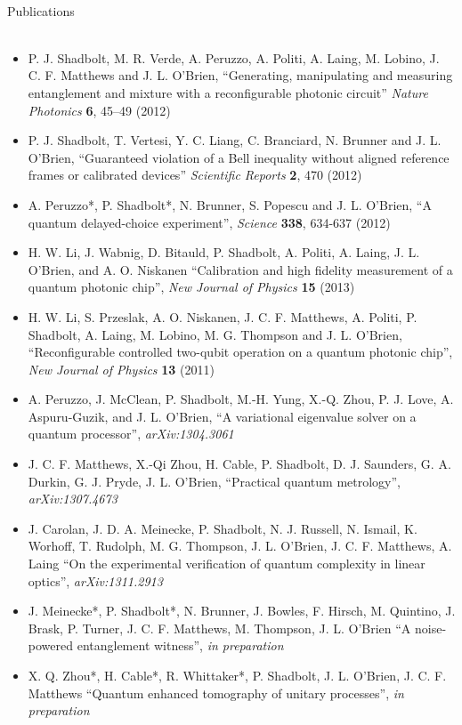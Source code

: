 \newpage
~\\
\vspace{00pt}
{\Large \sc Publications \\ \rm}
\vspace{15pt}
\

{\renewcommand\labelitemi{}
\begin{itemize}[leftmargin=0pt]
\item P. J. Shadbolt, M. R. Verde, A. Peruzzo, A. Politi, A. Laing, M. Lobino, J. C. F. Matthews and J. L. O'Brien, ``Generating, manipulating and measuring entanglement and mixture with a reconfigurable photonic circuit'' \textit{Nature Photonics} \textbf{6}, 45--49 (2012)
\item P. J. Shadbolt, T. Vertesi, Y. C. Liang, C. Branciard, N. Brunner and J. L. O'Brien, ``Guaranteed violation of a Bell inequality without aligned reference frames or calibrated devices'' \textit{Scientific Reports} \textbf{2}, 470 (2012)
\item A. Peruzzo*, P. Shadbolt*, N. Brunner, S. Popescu and J. L. O'Brien, ``A quantum delayed-choice experiment'',  \textit{Science} \textbf{338}, 634-637 (2012)
\item H. W. Li, J. Wabnig, D. Bitauld, P. Shadbolt, A. Politi, A. Laing, J. L. O'Brien, and A. O. Niskanen ``Calibration and high fidelity measurement of a quantum photonic chip'', \textit{New Journal of Physics} \textbf{15} (2013) 
\item H. W. Li, S. Przeslak, A. O. Niskanen, J. C. F. Matthews, A. Politi, P. Shadbolt, A. Laing, M. Lobino, M. G. Thompson and J. L. O'Brien, ``Reconfigurable controlled two-qubit operation on a quantum photonic chip'', \textit{New Journal of Physics} \textbf{13} (2011) 
\item A. Peruzzo, J. McClean, P. Shadbolt, M.-H. Yung, X.-Q. Zhou, P. J. Love, A. Aspuru-Guzik, and J. L. O'Brien, ``A variational eigenvalue solver on a quantum processor'', \emph{arXiv:1304.3061}
\item J. C. F. Matthews, X.-Qi Zhou, H. Cable, P. Shadbolt, D. J. Saunders, G. A. Durkin, G. J. Pryde, J. L. O'Brien, ``Practical quantum metrology'', \emph{arXiv:1307.4673}
\item J. Carolan, J. D. A. Meinecke, P. Shadbolt, N. J. Russell, N. Ismail, K. Worhoff, T. Rudolph, M. G. Thompson, J. L. O'Brien, J. C. F. Matthews, A. Laing ``On the experimental verification of quantum complexity in linear optics'', \emph{arXiv:1311.2913} 
\item J. Meinecke*, P. Shadbolt*, N. Brunner, J. Bowles, F. Hirsch, M. Quintino, J. Brask, P. Turner, J. C. F. Matthews, M. Thompson, J. L. O'Brien ``A noise-powered entanglement witness'', \emph{in preparation}
\item  X. Q. Zhou*, H. Cable*,  R. Whittaker*, P. Shadbolt, J. L. O'Brien, J. C. F. Matthews ``Quantum enhanced tomography of unitary processes'', \emph{in preparation}
\end{itemize}
}



